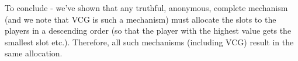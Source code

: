 \documentclass[a4page,notitlepage]{article}
\begin{document}
\begin{enumerate}
\begin{enumerate}
      To conclude - we've shown that any truthful, anonymous, complete mechanism (and we note that VCG is such a mechanism) must allocate the slots to the players in a descending order (so that the player with the highest value gets the smallest slot etc.).
      Therefore, all such mechanisms (including VCG) result in the same allocation.
    \end{enumerate}
\end{enumerate}
\end{document}
